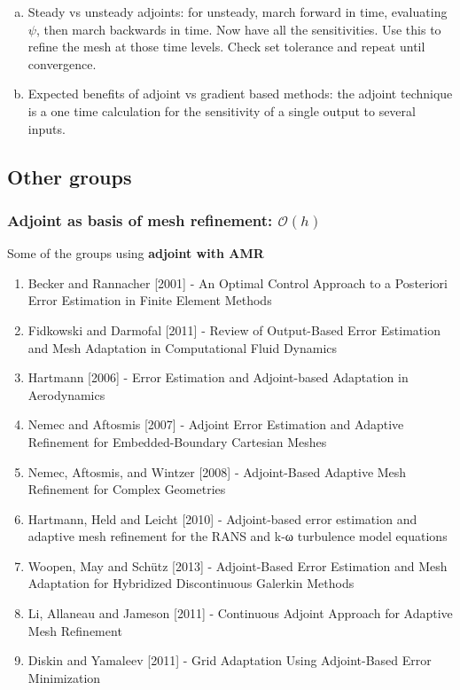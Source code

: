\documentclass{beamer}
\begin{document}
\begin{frame}
\begin{enumerate}[(a)]
\item Steady vs unsteady adjoints: for unsteady, march forward in time, evaluating $\psi$, then march backwards in time. Now have all the sensitivities. Use this to refine the mesh at those time levels. Check set tolerance and repeat until convergence.
\item Expected benefits of adjoint vs gradient based methods: the adjoint technique is a one time calculation for the sensitivity of a single output to several inputs.
\end{enumerate}

\end{frame}


\subsection{Other groups}
\begin{frame}%
\frametitle{Adjoint as basis of mesh refinement: $\mathcal{O}(h)$}
\scriptsize
Some of the groups using \textbf{adjoint with AMR}
\begin{enumerate}[1.]
\item Becker and Rannacher [2001] - An Optimal Control Approach to a Posteriori Error Estimation in Finite Element Methods
\item Fidkowski and Darmofal [2011] - Review of Output-Based Error Estimation and Mesh Adaptation in Computational Fluid Dynamics
\item Hartmann [2006] - Error Estimation and Adjoint-based Adaptation in Aerodynamics
\item Nemec and Aftosmis [2007] - Adjoint Error Estimation and Adaptive Refinement for Embedded-Boundary Cartesian Meshes
\item Nemec, Aftosmis, and Wintzer [2008] - Adjoint-Based Adaptive Mesh Refinement for Complex Geometries
\item Hartmann, Held and Leicht [2010] - Adjoint-based error estimation and adaptive mesh refinement for the RANS and k-ω turbulence model equations
\item Woopen, May and Sch{\"u}tz [2013] - Adjoint-Based Error Estimation and Mesh Adaptation for Hybridized Discontinuous Galerkin Methods
\item Li, Allaneau and Jameson [2011] - Continuous Adjoint Approach for Adaptive Mesh Refinement
\item Diskin and Yamaleev [2011] - Grid Adaptation Using Adjoint-Based Error Minimization
\end{enumerate}
\end{frame}
\end{document}
